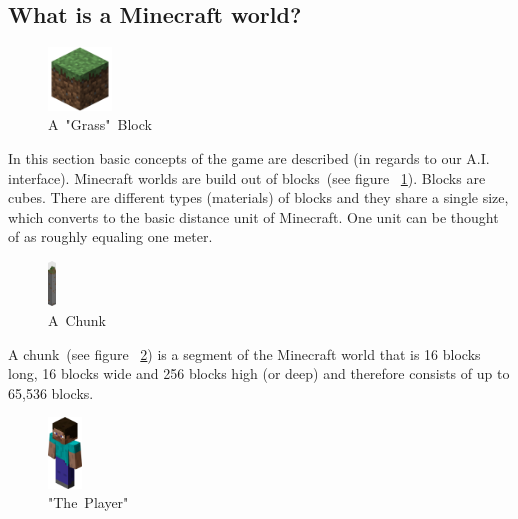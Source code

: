         \subsection{What is a Minecraft world?}

\begin{figure}
  \begin{center}
    \includegraphics[width=0.15\textwidth]{graphics/block}
  \end{center}
  \caption{A~"Grass"~Block~\cite{image_mob}}
  \label{mc_block}
\end{figure}

In this section basic concepts of the game are described (in regards to our A.I. interface). Minecraft worlds are build out of blocks~(see figure ~\ref{mc_block}). Blocks are cubes. There are different types (materials) of blocks and they share a single size, which converts to the basic distance unit of Minecraft. One unit can be thought of as roughly equaling one meter.\\[3ex]

\begin{figure}
  \begin{center}
    \includegraphics[width=0.02\textwidth]{graphics/chunk}
  \end{center}
  \caption{A~Chunk~\cite{image_mob}}
  \label{mc_chunk}
\end{figure}  

A chunk~(see figure ~\ref{mc_chunk}) is a segment of the Minecraft world that is 16 blocks long, 16 blocks wide and 256 blocks high (or deep) and therefore consists of up to 65,536 blocks.~\cite{mcwiki_chunks}\\[22ex]

\begin{figure}
  \begin{center}
    \includegraphics[width=0.08\textwidth]{graphics/player}
  \end{center}
  \caption{"The~Player"~\cite{image_mob}}
  \label{mc_player}
\end{figure} 

